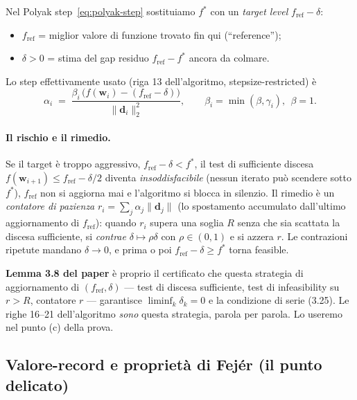\documentclass[11pt,a4paper]{article}
\theoremstyle{definition}
\newcommand{\w}{\bm{w}}
\newcommand{\dvec}{\bm{d}}
\newcommand{\fstar}{f^{*}}
\newcommand{\fref}{f_{\mathrm{ref}}}
\newcommand{\norm}[1]{\lVert #1\rVert}
\begin{document}
Nel Polyak step~\eqref{eq:polyak-step} sostituiamo $\fstar$ con un \emph{target level}
$\fref-\delta$:
\begin{itemize}[leftmargin=1.4em]
\item $\fref$ = miglior valore di funzione trovato fin qui (``reference'');
\item $\delta>0$ = stima del gap residuo $\fref-\fstar$ ancora da colmare.
\end{itemize}
Lo step effettivamente usato (riga 13 dell'algoritmo, stepsize-restricted) è
\begin{equation}\label{eq:sr-step}
\alpha_i \;=\; \frac{\beta_i\,\big(f(\w_i)-(\fref-\delta)\big)}{\norm{\dvec_i}_2^2},
\qquad \beta_i=\min(\beta,\gamma_i),\ \ \beta=1 .
\end{equation}

\paragraph{Il rischio e il rimedio.} Se il target è troppo aggressivo, $\fref-\delta<\fstar$,
il test di sufficiente discesa $f(\w_{i+1})\le\fref-\delta/2$ diventa
\emph{insoddisfacibile} (nessun iterato può scendere sotto $\fstar$), $\fref$ non si aggiorna
mai e l'algoritmo si blocca in silenzio. Il rimedio è un \emph{contatore di pazienza}
$r_i=\sum_j\alpha_j\norm{\dvec_j}$ (lo spostamento accumulato dall'ultimo aggiornamento di
$\fref$): quando $r_i$ supera una soglia $R$ senza che sia scattata la discesa sufficiente, si
\emph{contrae} $\delta\mapsto\rho\delta$ con $\rho\in(0,1)$ e si azzera $r$. Le contrazioni
ripetute mandano $\delta\to0$, e prima o poi $\fref-\delta\ge\fstar$ torna feasible.

\begin{keybox}
\textbf{Lemma 3.8 del paper} è proprio il certificato che questa strategia di aggiornamento di
$(\fref,\delta)$ --- test di discesa sufficiente, test di infeasibility su $r>R$, contatore
$r$ --- garantisce $\liminf_k\delta_k=0$ e la condizione di serie (3.25). Le righe 16--21
dell'algoritmo \emph{sono} questa strategia, parola per parola. Lo useremo nel punto (c) della
prova.
\end{keybox}

\subsection{Valore-record e proprietà di Fej\'er (il punto delicato)}
\label{sub:fejer}
\end{document}
